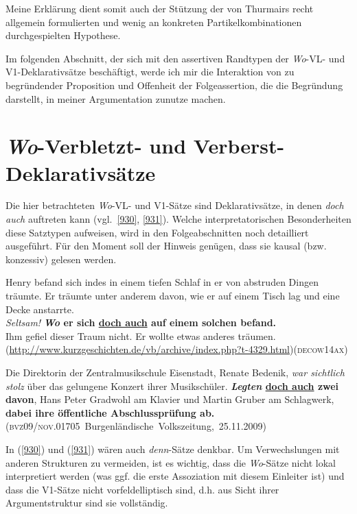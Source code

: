 {Meine Erklärung dient somit auch der Stützung der von Thurmairs recht allgemein formulierten und wenig an konkreten Partikelkombinationen durchgespielten Hypothese.

Im folgenden Abschnitt, der sich mit den assertiven Randtypen der \textit{Wo}-VL- und V1-Deklarativsätze beschäftigt, werde ich mir die Interaktion von zu begründender Proposition und Offenheit der Folgeassertion, die die Begründung darstellt, in meiner Argumentation zunutze machen.
\section{\textit{Wo}-Verbletzt- und Verberst-Deklarativsätze}
\label{sec:Rand}
Die hier betrachteten \textit{Wo}-VL- und V1-Sätze sind Deklarativsätze, in denen \textit{doch auch} auftreten kann (vgl.\ \ref{930}, \ref{931}). Welche interpretatorischen Besonderheiten diese Satztypen aufweisen, wird in den Folgeabschnitten noch detailliert ausgeführt. Für den Moment soll der Hinweis genügen, dass sie kausal (bzw. konzessiv) gelesen werden.

\begin{exe}
	\ex\label{930}

	Henry befand sich indes in einem tiefen Schlaf in er von abstruden Dingen träumte.
	Er träumte unter anderem davon, wie er auf einem Tisch lag und eine Decke anstarrte.\\
	\emph{Seltsam!} \textbf{\textit{Wo} er sich \ul{doch auch} auf einem solchen befand.}\\
	Ihm gefiel dieser Traum nicht. Er wollte etwas anderes träumen.\\ 				         
	{\scriptsize(\url{http://www.kurzgeschichten.de/vb/archive/index.php?t-4329.html})}\hfill\hbox{\scshape(decow14ax)}
	
\end{exe}

\begin{exe}
	\ex\label{931}

	Die Direktorin der Zentralmusikschule Eisenstadt, Renate Bedenik, \emph{war sichtlich stolz} über das gelungene Konzert ihrer Musikschüler. 				\textbf{\textit{Legten} \ul{doch auch} zwei davon}, Hans Peter Gradwohl am Klavier und Martin Gruber am Schlagwerk, \textbf{dabei ihre 				öffentliche Abschlussprüfung ab.}				         
	\newline
	\hbox{}\hfill\hbox{(\textsc{bvz09/nov.01705} Burgenländische Volkszeitung, 25.11.2009)}
\end{exe}										      
In (\ref{930}) und (\ref{931}) wären auch \textit{denn}-Sätze denkbar. Um Verwechslungen mit anderen Strukturen zu vermeiden, ist es wichtig, dass die \textit{Wo}-Sätze nicht lokal interpretiert werden (was ggf. die erste Assoziation mit diesem Einleiter ist) und dass die V1-Sätze nicht vorfeldelliptisch sind, d.h. aus Sicht ihrer Argumentstruktur sind sie vollständig.

}
